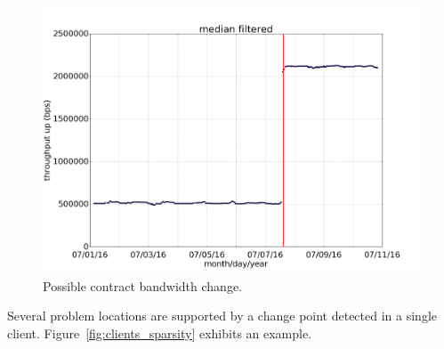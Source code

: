 \begin{figure}[H]
    \centering
    \includegraphics[width=0.7\linewidth]{./figures/results/final_remarks/change_contracted_bandwidth/serverGOIDTCSRV07_macF8:1A:67:2E:E4:9A_dtstart2016-07-01_dtend2016-07-11.png}
    \caption{Possible contract bandwidth change.}
\label{fig:throughput_up_increase}
\end{figure}%

Several problem locations are supported by a change point detected in a single
client.
Figure~\ref{fig:clients_sparsity} exhibits an example.

